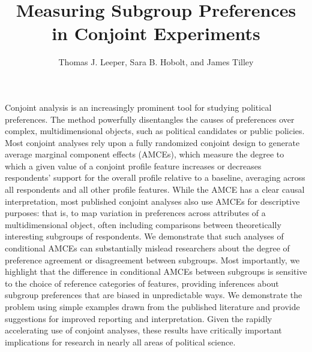 \documentclass[a4paper,12pt]{article}\usepackage[]{graphicx}\usepackage[]{color}
\title{Measuring Subgroup Preferences in Conjoint Experiments}
\author{Thomas J. Leeper, Sara B. Hobolt, and James Tilley}
\begin{document}
\maketitle

{\abstract Conjoint analysis is an increasingly prominent tool for studying political preferences. The method powerfully disentangles the causes of preferences over complex, multidimensional objects, such as political candidates or public policies. Most conjoint analyses rely upon a fully randomized conjoint design to generate average marginal component effects (AMCEs), which measure the degree to which a given value of a conjoint profile feature increases or decreases respondents' support for the overall profile relative to a baseline, averaging across all respondents and all other profile features. While the AMCE has a clear causal interpretation, most published conjoint analyses also use AMCEs for descriptive purposes: that is, to map variation in preferences across attributes of a multidimensional object, often including comparisons between theoretically interesting subgroups of respondents. We demonstrate that such analyses of conditional AMCEs can substantially mislead researchers about the degree of preference agreement or disagreement between subgroups. Most importantly, we highlight that the difference in conditional AMCEs between subgroups is sensitive to the choice of reference categories of features, providing inferences about subgroup preferences that are biased in unpredictable ways. We demonstrate the problem using simple examples drawn from the published literature and provide suggestions for improved reporting and interpretation. Given the rapidly accelerating use of conjoint analyses, these results have critically important implications for research in nearly all areas of political science.}

















\clearpage
\end{document}
